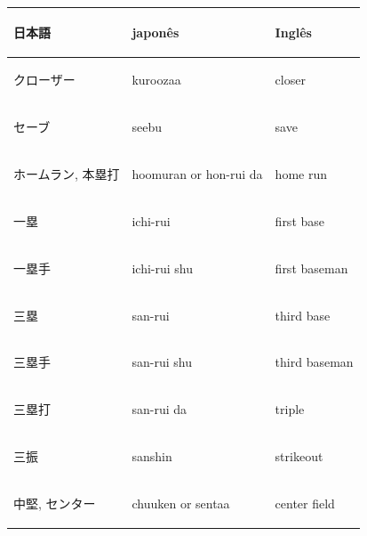 \begin{table}[!ht]
	\begin{center}
		
		
		\begin{tabular}{lll}
			\begin{CJK}{UTF8}{min}日本語\end{CJK} & japon\^es& Ingl\^es\\\hline\hline
			\begin{CJK}{UTF8}{min}クローザー \end{CJK} &kuroozaa                     & closer              \\\hline
			\begin{CJK}{UTF8}{min}セーブ \end{CJK} &seebu                          & save                \\\hline
			\begin{CJK}{UTF8}{min}ホームラン, 本塁打 \end{CJK} &hoomuran or hon-rui da  & home run            \\\hline
			\begin{CJK}{UTF8}{min}一塁 \end{CJK} &ichi-rui                        & first base          \\\hline
			\begin{CJK}{UTF8}{min}一塁手 \end{CJK} &ichi-rui shu                   & first baseman       \\\hline
			\begin{CJK}{UTF8}{min}三塁 \end{CJK} &san-rui                         & third base          \\\hline
			\begin{CJK}{UTF8}{min}	三塁手 \end{CJK} &san-rui shu                    & third baseman       \\\hline
			\begin{CJK}{UTF8}{min}三塁打 \end{CJK} &san-rui da                     & triple              \\\hline
			\begin{CJK}{UTF8}{min}三振 \end{CJK} &sanshin                         & strikeout           \\\hline
			\begin{CJK}{UTF8}{min}中堅, センター \end{CJK} &chuuken or sentaa         & center field        \\\hline

\end{tabular}
\end{center}
\end{table}
